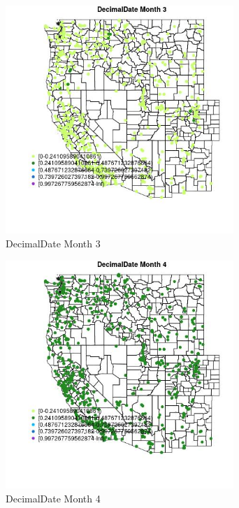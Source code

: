 \begin{figure} 
\centering  
\includegraphics[width=0.77\textwidth]{Code_Outputs/Report_ML_input_PM25_Step4_part_e_de_duplicated_aveswNAs_MapObsMo3DecimalDate.jpg} 
\caption{\label{fig:Report_ML_input_PM25_Step4_part_e_de_duplicated_aveswNAsMapObsMo3DecimalDate}DecimalDate Month 3} 
\end{figure} 
 

\begin{figure} 
\centering  
\includegraphics[width=0.77\textwidth]{Code_Outputs/Report_ML_input_PM25_Step4_part_e_de_duplicated_aveswNAs_MapObsMo4DecimalDate.jpg} 
\caption{\label{fig:Report_ML_input_PM25_Step4_part_e_de_duplicated_aveswNAsMapObsMo4DecimalDate}DecimalDate Month 4} 
\end{figure} 
 

